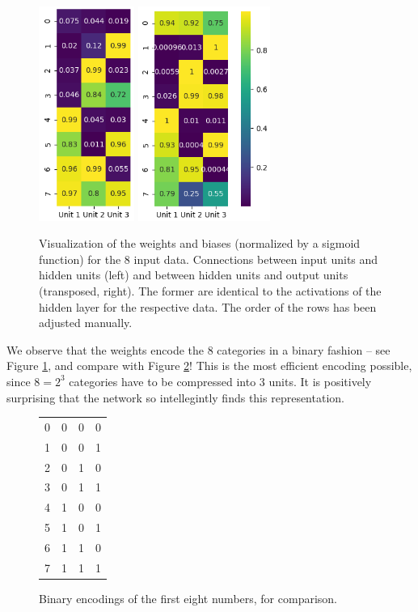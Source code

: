 \documentclass[conference]{IEEEtran}
\begin{document}
\begin{figure}
    \centering
    \includegraphics[height=7cm]{hidden1.png}
    \includegraphics[height=7cm]{hidden2.png}
    \caption{Visualization of the weights and biases (normalized by a sigmoid function) for the 8 input data. Connections between input units and hidden units (left) and between hidden units and output units (transposed, right). The former are identical to the activations of the hidden layer for the respective data. The order of the rows has been adjusted manually.}
    \label{fig:hidden}
\end{figure}

We observe that the weights encode the 8 categories in a binary fashion -- see Figure \ref{fig:hidden}, and compare with Figure \ref{fig:truthtable}! This is the most efficient encoding possible, since $8=2^3$ categories have to be compressed into $3$ units. It is positively surprising that the network so intellegintly finds this representation.

\begin{figure}
    \centering
    \begin{tabular}{l|lll}
    0 & 0 & 0 & 0 \\
    1 & 0 & 0 & 1 \\
    2 & 0 & 1 & 0 \\
    3 & 0 & 1 & 1 \\
    4 & 1 & 0 & 0 \\
    5 & 1 & 0 & 1 \\
    6 & 1 & 1 & 0 \\
    7 & 1 & 1 & 1 \\
    \end{tabular}
    \caption{Binary encodings of the first eight numbers, for comparison.}
    \label{fig:truthtable}
\end{figure}
\end{document}
